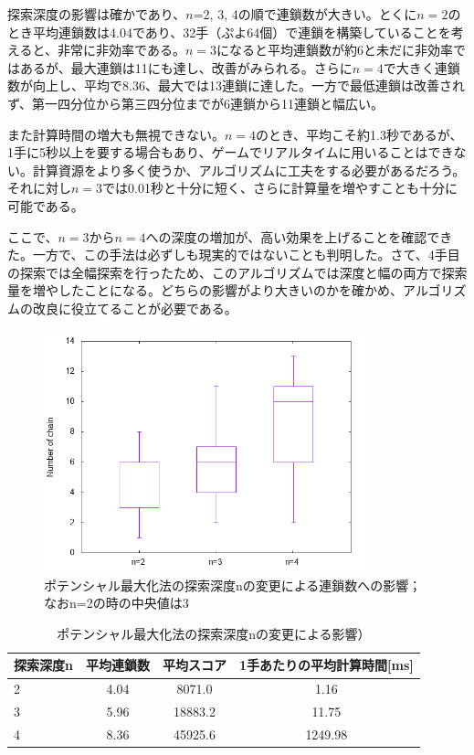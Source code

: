 \documentclass[12pt]{jarticle}
\begin{document}
探索深度の影響は確かであり、$n$=2, 3, 4の順で連鎖数が大きい。とくに$n=2$のとき平均連鎖数は4.04であり、32手（ぷよ64個）で連鎖を構築していることを考えると、非常に非効率である。$n=3$になると平均連鎖数が約6と未だに非効率ではあるが、最大連鎖は11にも達し、改善がみられる。さらに$n=4$で大きく連鎖数が向上し、平均で8.36、最大では13連鎖に達した。一方で最低連鎖は改善されず、第一四分位から第三四分位までが6連鎖から11連鎖と幅広い。

また計算時間の増大も無視できない。$n=4$のとき、平均こそ約1.3秒であるが、1手に5秒以上を要する場合もあり、ゲームでリアルタイムに用いることはできない。計算資源をより多く使うか、アルゴリズムに工夫をする必要があるだろう。それに対し$n=3$では0.01秒と十分に短く、さらに計算量を増やすことも十分に可能である。

ここで、$n=3$から$n=4$への深度の増加が、高い効果を上げることを確認できた。一方で、この手法は必ずしも現実的ではないことも判明した。さて、4手目の探索では全幅探索を行ったため、このアルゴリズムでは深度と幅の両方で探索量を増やしたことになる。どちらの影響がより大きいのかを確かめ、アルゴリズムの改良に役立てることが必要である。

\begin{figure}[hbt]
  \begin{center}
  \includegraphics[height=7cm]{experiment/Potential/KAI/graph/chain_N2_4.png}
  \caption{ポテンシャル最大化法の探索深度nの変更による連鎖数への影響；なおn=2の時の中央値は3} \label{fig:poten_chain_depth}
\end{center}
\end{figure}


\begin{table}[htb]
\begin{center}
\caption{ポテンシャル最大化法の探索深度nの変更による影響）} \label{tab:poten_depth}
\begin{tabular}{|l|c|c|c|} \hline
探索深度n & 平均連鎖数 & 平均スコア & 1手あたりの平均計算時間[ms]\\ \hline
2 & 4.04 & 8071.0 & 1.16\\ \hline
3 & 5.96 & 18883.2 & 11.75\\ \hline
4 & 8.36 & 45925.6 & 1249.98\\ \hline
\end{tabular}
\end{center}
\end{table}
\end{document}
